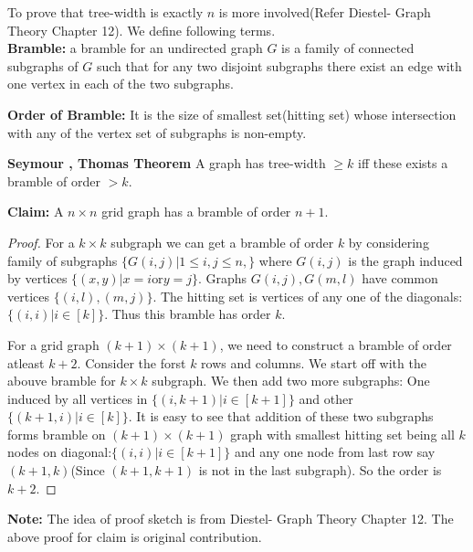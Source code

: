 \documentclass[addpoints,11pt,a4paper]{exam}
\begin{document}
\begin{questions}
\begin{parts}
\begin{solution}
To prove that tree-width is exactly $n$ is more involved(Refer Diestel- Graph Theory Chapter 12). We define following terms.\\
\textbf{Bramble:} a bramble for an undirected graph $G$ is a family of connected subgraphs of $G$ such that for any two disjoint subgraphs there exist an edge with one vertex in each of the two subgraphs.

\textbf{Order of Bramble:} It is the size of smallest set(hitting set) whose intersection with any of the vertex set of subgraphs is non-empty.

\textbf{Seymour , Thomas Theorem} A graph has tree-width $\geq k$ iff these exists a bramble of order $>k$.


\textbf{Claim:} A $n\times n$ grid graph has a bramble of order $n+1$.
\begin{proof} 

For a $k\times k$ subgraph we can get a bramble of order $k$ by considering family of subgraphs $\{G(i,j)|1\leq i,j \leq n,\}$ where $G(i,j)$ is the graph induced by vertices $\{(x,y)|x=i \text{or} y=j\}$. Graphs $G(i,j),G(m,l)$ have common vertices $\{(i,l),(m,j)\}$. The hitting set is vertices of any one of the diagonals: $\{(i,i)|i\in [k]\}$. Thus this bramble has order $k$.

For a grid graph $(k+1)\times (k+1)$, we need to construct a bramble of order atleast $k+2$. Consider the forst $k$ rows and columns. We start off with the abouve bramble for $k\times k$ subgraph. We then add two more subgraphs: One induced by all vertices in $\{(i,k+1)|i\in [k+1]\}$ and other $\{(k+1,i)|i\in [k]\}$. It is easy to see that addition of these two subgraphs forms bramble on $(k+1)\times (k+1)$ graph with smallest hitting set being all $k$ nodes on diagonal:$\{(i,i)|i\in [k+1]\}$ and any one node from last row say $(k+1,k)$(Since $(k+1,k+1)$ is not in the last subgraph). So the order is $k+2$.

\end{proof}

\textbf{Note:} The idea of proof sketch is from Diestel- Graph Theory Chapter 12. The above proof for claim is original contribution.

\end{solution}

\end{parts}
\end{questions}
\end{document}
